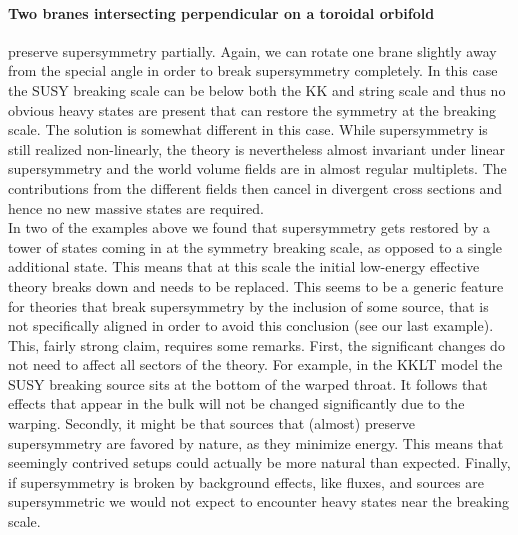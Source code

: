\documentclass[a4paper,12pt,twoside,openright]{report}
\begin{document}
\paragraph{Two branes intersecting perpendicular on a toroidal orbifold} preserve supersymmetry partially. Again, we can rotate one brane slightly away from the special angle in order to break supersymmetry completely. In this case the SUSY breaking scale can be below both the KK and string scale and thus no obvious heavy states are present that can restore the symmetry at the breaking scale. The solution is somewhat different in this case. While supersymmetry is still realized non-linearly, the theory is nevertheless almost invariant under linear supersymmetry and the world volume fields are in almost regular multiplets. The contributions from the different fields then cancel in divergent cross sections and hence no new massive states are required.\vspace{12pt}\\ %
In two of the examples above we found that supersymmetry gets restored by a tower of states coming in at the symmetry breaking scale, as opposed to a single additional state. This means that at this scale the initial low-energy effective theory breaks down and needs to be replaced. This seems to be a generic feature for theories that break supersymmetry by the inclusion of some source, that is not specifically aligned in order to avoid this conclusion (see our last example).\\
This, fairly strong claim, requires some remarks. First, the significant changes do not need to affect all sectors of the theory. For example, in the KKLT model the SUSY breaking source sits at the bottom of the warped throat. It follows that effects that appear in the bulk will not be changed significantly due to the warping. Secondly, it might be that sources that (almost) preserve supersymmetry are favored by nature, as they minimize energy. This means that seemingly contrived setups could actually be more natural than expected. Finally, if supersymmetry is broken by background effects, like fluxes, and sources are supersymmetric we would not expect to encounter heavy states near the breaking scale.
\end{document}
